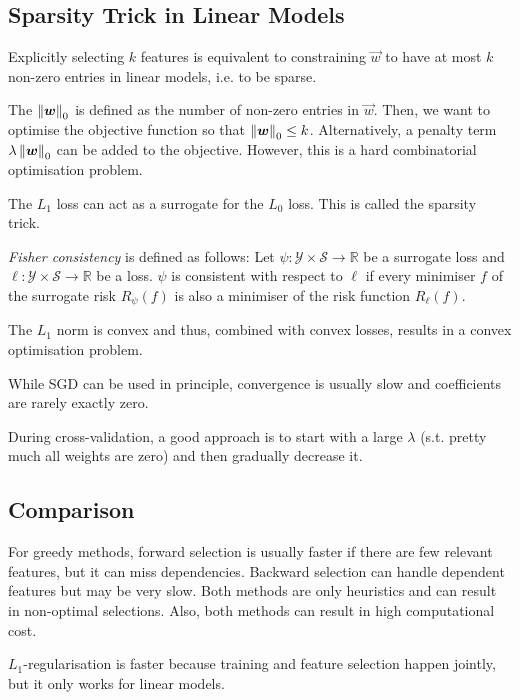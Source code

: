 \subsection{Sparsity Trick in Linear Models}
Explicitly selecting $k$ features is equivalent to constraining
$\vec{w}$ to have at most $k$ non-zero entries in linear models,
i.e. to be sparse.

The $\left\lVert\boldsymbol{w}\right\rVert_0$ is defined as the number of non-zero
entries in $\vec{w}$.
Then, we want to optimise the objective function so that
$\left\lVert\boldsymbol{w}\right\rVert_0 \leq k$.
Alternatively, a penalty term $\lambda \left\lVert\boldsymbol{w}\right\rVert_0$
can be added to the objective.
However, this is a hard combinatorial optimisation problem.

The $L_1$ loss can act as a surrogate for the $L_0$ loss.
This is called the sparsity trick.

\emph{Fisher consistency} is defined as follows:
Let $\psi : \mathcal{Y} \times \mathcal{S} \to \mathbb{R}$
be a surrogate loss and
$\ell : \mathcal{Y} \times \mathcal{S} \to \mathbb{R}$
be a loss.
$\psi$ is consistent with respect to $\ell$
if every minimiser $f$ of the surrogate risk
$R_\psi(f)$ is also a minimiser of the
risk function $R_\ell(f)$.

The $L_1$ norm is convex and thus,
combined with convex losses,
results in a convex optimisation problem.

While SGD can be used in principle,
convergence is usually slow and coefficients
are rarely exactly zero.

During cross-validation, a good approach is to start with
a large $\lambda$ (s.t. pretty much all weights are zero)
and then gradually decrease it.


\subsection{Comparison}
For greedy methods,
forward selection is usually faster if there are few relevant
features, but it can miss dependencies.
Backward selection can handle dependent features but may be
very slow.
Both methods are only heuristics and can result in non-optimal
selections.
Also, both methods can result in high computational cost.

$L_1$-regularisation is faster because training and feature
selection happen jointly,
but it only works for linear models.
